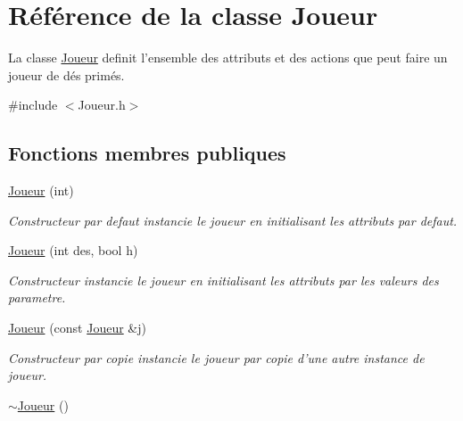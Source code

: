 \hypertarget{class_joueur}{\section{\-Référence de la classe \-Joueur}
\label{class_joueur}
}


\-La classe \hyperlink{class_joueur}{\-Joueur} definit l'ensemble des attributs et des actions que peut faire un joueur de dés primés.  




{\ttfamily \#include $<$\-Joueur.\-h$>$}

\subsection*{\-Fonctions membres publiques}
\begin{DoxyCompactItemize}
\item 
\hypertarget{class_joueur_a77cc168f6bccf04e74a92af097177d77}{\hyperlink{class_joueur_a77cc168f6bccf04e74a92af097177d77}{\-Joueur} (int)}\label{class_joueur_a77cc168f6bccf04e74a92af097177d77}

\begin{DoxyCompactList}\small\item\em \-Constructeur par defaut instancie le joueur en initialisant les attributs par defaut. \end{DoxyCompactList}\item 
\hyperlink{class_joueur_a1b8ae08199dec8d6d542a6f31d083479}{\-Joueur} (int des, bool h)
\begin{DoxyCompactList}\small\item\em \-Constructeur instancie le joueur en initialisant les attributs par les valeurs des parametre. \end{DoxyCompactList}\item 
\hypertarget{class_joueur_a9e63dd20058f8863c919534149eb795e}{\hyperlink{class_joueur_a9e63dd20058f8863c919534149eb795e}{\-Joueur} (const \hyperlink{class_joueur}{\-Joueur} \&j)}\label{class_joueur_a9e63dd20058f8863c919534149eb795e}

\begin{DoxyCompactList}\small\item\em \-Constructeur par copie instancie le joueur par copie d'une autre instance de joueur. \end{DoxyCompactList}\item 
\hypertarget{class_joueur_a9fb594f755601ee77ce5884c4c0861f3}{\hyperlink{class_joueur_a9fb594f755601ee77ce5884c4c0861f3}{$\sim$\-Joueur} ()}\label{class_joueur_a9fb594f755601ee77ce5884c4c0861f3}


\end{DoxyCompactItemize}
